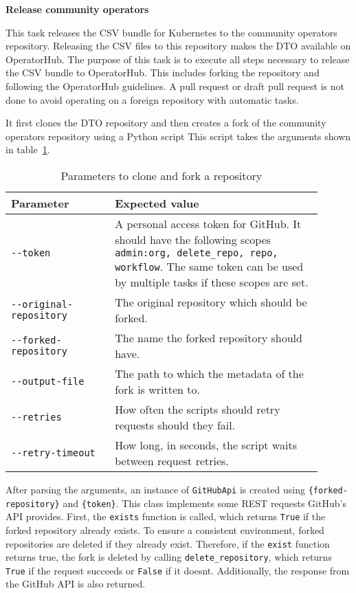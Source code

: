 \textbf{Release community operators}

This task releases the CSV bundle for Kubernetes to the community operators repository.
Releasing the CSV files to this repository makes the DTO available on OperatorHub.
The purpose of this task is to execute all steps necessary to release the CSV bundle to OperatorHub.
This includes forking the repository and following the OperatorHub guidelines.
A pull request or draft pull request is not done to avoid operating on a foreign repository with automatic tasks.

It first clones the DTO repository and then creates a fork of the community operators repository using a Python script
This script takes the arguments shown in table~\ref{tab:parameters-to-clone-and-fork-a-repository}.

\begin{table}[h]
    \centering
    \caption{Parameters to clone and fork a repository}
    \label{tab:parameters-to-clone-and-fork-a-repository}
    \begin{tabular}{p{0.3\linewidth}|p{0.6\linewidth}}
        Parameter & Expected value \\
        \hline
        \verb|--token| & A personal access token for GitHub.
            It should have the following scopes \verb|admin:org, delete_repo, repo, workflow|.
            The same token can be used by multiple tasks if these scopes are set. \\
        \verb|--original-repository| & The original repository which should be forked. \\
        \verb|--forked-repository| & The name the forked repository should have. \\
        \verb|--output-file| & The path to which the metadata of the fork is written to. \\
        \verb|--retries| & How often the scripts should retry requests should they fail. \\
        \verb|--retry-timeout| & How long, in seconds, the script waits between request retries. \\
    \end{tabular}
\end{table}

After parsing the arguments, an instance of \verb|GitHubApi| is created using \verb|{forked-repository}| and \verb|{token}|.
This class implements some REST requests GitHub's API provides.
First, the \verb|exists| function is called, which returns \verb|True| if the forked repository already exists.
To ensure a consistent environment, forked repositories are deleted if they already exist.
Therefore, if the \verb|exist| function returns true, the fork is deleted by calling \verb|delete_repository|, which returns \verb|True| if the request succeeds or \verb|False| if it doesnt.
Additionally, the response from the GitHub API is also returned.

